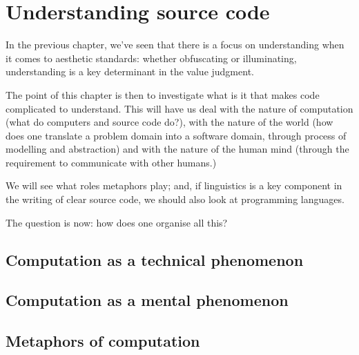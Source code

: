 \chapter{Understanding source code}

In the previous chapter, we've seen that there is a focus on understanding when it comes to aesthetic standards: whether obfuscating or illuminating, understanding is a key determinant in the value judgment.

The point of this chapter is then to investigate what is it that makes code complicated to understand. This will have us deal with the nature of computation (what do computers and source code do?), with the nature of the world (how does one translate a problem domain into a software domain, through process of modelling and abstraction) and with the nature of the human mind (through the requirement to communicate with other humans.)

We will see what roles metaphors play; and, if linguistics is a key component in the writing of clear source code, we should also look at programming languages.

The question is now: how does one organise all this?

\section{Computation as a technical phenomenon}

\section{Computation as a mental phenomenon}

\section{Metaphors of computation}